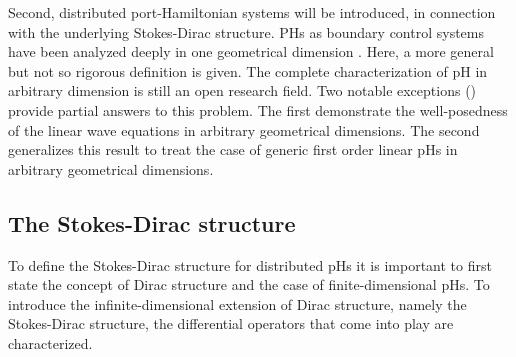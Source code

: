 Second, distributed port-Hamiltonian systems will be introduced, in connection with the underlying Stokes-Dirac structure. PHs as boundary control systems have been analyzed deeply in one geometrical dimension \cite{zwart2012,legorrec2005}. Here, a more general but not so rigorous definition is given. The complete characterization of pH in arbitrary dimension is still an open research field. Two notable exceptions (\cite{zwart2015wave,skrepek2019wellposedness}) provide partial answers to this problem. The first demonstrate the well-posedness of the linear wave equations in arbitrary geometrical dimensions. The second generalizes this result to treat the case of generic first order linear pHs in arbitrary geometrical dimensions.

 
\subsection{The Stokes-Dirac structure}

To define the Stokes-Dirac structure for distributed pHs it is important to first state the concept of Dirac structure and the case of finite-dimensional pHs. To introduce the infinite-dimensional extension of Dirac structure, namely the Stokes-Dirac structure, the differential operators that come into play are characterized. 

